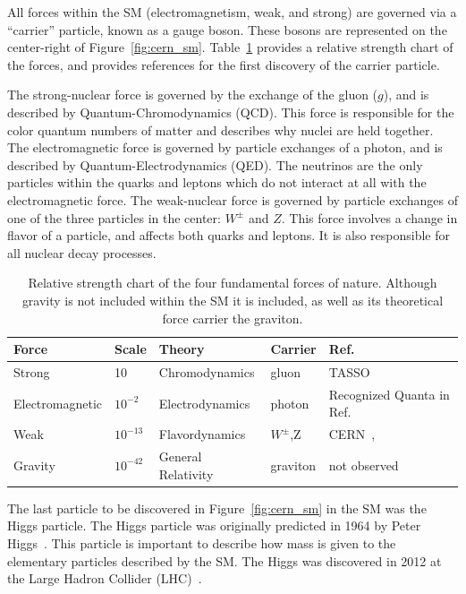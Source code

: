 All forces within the SM (electromagnetism, weak, and strong) are governed via a ``carrier'' particle, known as a gauge boson.
These bosons are represented on the center-right of Figure~\ref{fig:cern_sm}.
Table~\ref{table:forces} provides a relative strength chart of the forces, and provides references for the first discovery of the carrier particle.

The strong-nuclear force is governed by the exchange of the gluon ($g$), and is described by Quantum-Chromodynamics (QCD).
This force is responsible for the color quantum numbers of matter and describes why nuclei are held together.
The electromagnetic force is governed by particle exchanges of a photon, and is described by Quantum-Electrodynamics (QED).
The neutrinos are the only particles within the quarks and leptons which do not interact at all with the electromagnetic force.
The weak-nuclear force is governed by particle exchanges of one of the three particles in the center: $W^{\pm}$ and $Z$.
This force involves a change in flavor of a particle, and affects both quarks and leptons.
It is also responsible for all nuclear decay processes.

\begin{table}
\begin{center}
\begin{tabular}{||p{30mm} p{20mm} p{40mm} p{25mm} p{35mm}||}
 \hline
 Force & Scale & Theory & Carrier & Ref. \\ [0.5ex]
 \hline\hline
 Strong & 10 & Chromodynamics & gluon & TASSO~\citep{tasso_1978_BRANDELIK1979243, PETRA_PhysRevLett.43.830} \\
 \hline
 Electromagnetic & $10^{-2} $ & Electrodynamics & photon & Recognized Quanta in Ref.~\citep{https://doi.org/10.1002/andp.19053220607} \\
 \hline
 Weak & $10^{-13}$ & Flavordynamics & $W^{\pm}$,Z & CERN~\citep{wboson_measure_ARNISON1983103},\citep{zboson_measure_1983398}\\
 \hline
 Gravity & $10^{-42}$ & General Relativity & graviton  & not observed \\
 \hline
 \hline
\end{tabular}
\caption{Relative strength chart of the four fundamental forces of nature. 
Although gravity is not included within the SM it is included, as well as its theoretical force carrier the graviton.
}
\label{table:forces}
\end{center}
\end{table}

The last particle to be discovered in Figure~\ref{fig:cern_sm} in the SM was the Higgs particle.
The Higgs particle was originally predicted in 1964 by Peter Higgs~\citep{HIGGS1964132}.
This particle is important to describe how mass is given to the elementary particles described by the SM.
The Higgs was discovered in 2012 at the Large Hadron Collider (LHC)~\citep{higgs_discovery_20121}.

